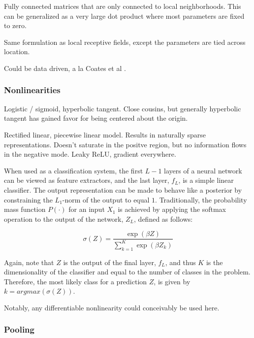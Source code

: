 Fully connected matrices that are only connected to local neighborhoods.
This can be generalized as a very large dot product where most parameters are fixed to zero.

Same formulation as local receptive fields, except the parameters are tied across location.

Could be data driven, a la Coates et al \cite{Coates2012?}.

\subsubsection{Nonlinearities}

Logistic / sigmoid, hyperbolic tangent.
Close cousins, but generally hyperbolic tangent has gained favor for being centered about the origin.

Rectified linear, piecewise linear model. %
Results in naturally sparse representations.
Doesn't saturate in the positve region, but no information flows in the negative mode.
Leaky ReLU, gradient everywhere.

When used as a classification system, the first $L-1$ layers of a neural network can be viewed as feature extractors, and the last layer, $f_L$, is a simple linear classifier.
The output representation can be made to behave like a posterior by constraining the $L_1$-norm of the output to equal $1$.
Traditionally, the probability mass function $P(\cdot)$ for an input $X_1$ is achieved by applying the softmax operation to the output of the network, $Z_L$, defined as follows:

\begin{equation}
\label{eq:softmax}
\sigma(Z) = \frac{\exp(\beta Z)}{ \sum_{k=1}^{K}\exp{(\beta Z_k)}}
\end{equation}

\noindent Again, note that $Z$ is the output of the final layer, $f_L$, and thus $K$ is the dimensionality of the classifier and equal to the number of classes in the problem.
Therefore, the most likely class for a prediction $Z$, is given by $k = argmax(\sigma(Z))$.

Notably, any differentiable nonlinearity could conceivably be used here.


\subsubsection{Pooling}

